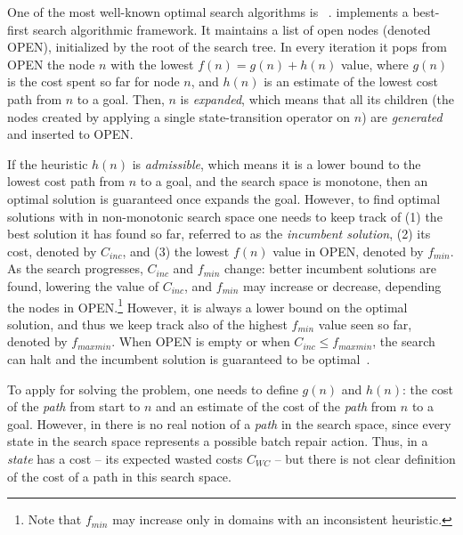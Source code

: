 {One of the most well-known optimal search algorithms is \astar{}~\cite{hart1968formal}. \astar{} implements a best-first search algorithmic framework. It maintains a list of open nodes (denoted OPEN), initialized by the root of the search tree. 
In every iteration it pops from OPEN the node $n$ with the lowest $f(n)=g(n)+h(n)$ value, 
where $g(n)$ is the cost spent so far for node $n$, and $h(n)$ is an estimate of the lowest cost path from $n$ to a goal. Then, $n$ is {\em expanded}, which means that all its children (the nodes created by applying a single state-transition operator on $n$) are {\em generated} and inserted to OPEN.


If the heuristic $h(n)$ is \emph{admissible}, which means it is a lower bound to the lowest cost path from $n$ to a goal, and the search space is monotone, then an optimal solution is guaranteed once \astar{} expands the goal. However, to find optimal solutions with \astar{} in non-monotonic search space one needs to keep track of (1) the best solution it has found so far, referred to as the \emph{incumbent solution}, (2) its cost, denoted by $C_{inc}$, and (3) the lowest $f(n)$ value in OPEN, denoted by $f_{min}$. 
As the search progresses, $C_{inc}$ and $f_{min}$ change: better incumbent solutions are found, lowering the value of $C_{inc}$, 
and $f_{min}$ may increase or decrease, depending the nodes in OPEN.\footnote{Note that $f_{min}$ may increase only in domains with an inconsistent heuristic.} However, it is always a lower bound on the optimal solution, and thus we keep track also of the highest $f_{min}$ value seen so far, denoted by $f_{maxmin}$. When OPEN is empty or when $C_{inc}\leq f_{maxmin}$, the search can halt and the incumbent solution is guaranteed to be optimal~\cite{stern2014max}. 


To apply \astar{} for solving the \brpswc{} problem, one needs to define $g(n)$ and $h(n)$: the cost of the \emph{path} from start to $n$ and an estimate of the cost of the \emph{path} from $n$ to a goal. However, in \brpswc{} there is no real notion of a \emph{path} in the \brpswc{} search space, since every state in the \brpswc{} search space represents a possible batch repair action. Thus, in \brpswc{} a \emph{state} has a cost -- its expected wasted costs $C_{WC}$ -- but there is not clear definition of the cost of a path in this search space. %







}

